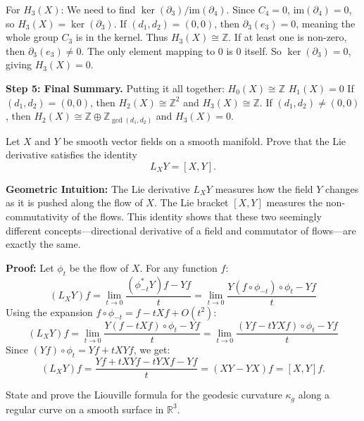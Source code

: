 \begin{solution}
For $H_3(X)$: We need to find $\ker(\partial_3) / \mathrm{im}(\partial_4)$. Since $C_4=0$, $\mathrm{im}(\partial_4)=0$, so $H_3(X) = \ker(\partial_3)$.
If $(d_1, d_2) = (0,0)$, then $\partial_3(e_3) = 0$, meaning the whole group $C_3$ is in the kernel. Thus $H_3(X) \cong \mathbb{Z}$.
If at least one is non-zero, then $\partial_3(e_3) \neq 0$. The only element mapping to $0$ is $0$ itself. So $\ker(\partial_3) = 0$, giving $H_3(X) = 0$.

\textbf{Step 5: Final Summary.}
Putting it all together:
$H_0(X) \cong \mathbb{Z}$
$H_1(X) = 0$
If $(d_1, d_2) = (0,0)$, then $H_2(X) \cong \mathbb{Z}^2$ and $H_3(X) \cong \mathbb{Z}$.
If $(d_1, d_2) \neq (0,0)$, then $H_2(X) \cong \mathbb{Z} \oplus \mathbb{Z}_{\gcd(d_1, d_2)}$ and $H_3(X) = 0$.
\end{solution}

\begin{exercise}
\label{geometry:2017:3}
Let $X$ and $Y$ be smooth vector fields on a smooth manifold. Prove that the Lie derivative satisfies the identity
\[ L_{X}Y = [X, Y]. \]
\end{exercise}

\begin{solution}
\textbf{Geometric Intuition:} The Lie derivative $L_X Y$ measures how the field $Y$ changes as it is pushed along the flow of $X$. The Lie bracket $[X, Y]$ measures the non-commutativity of the flows. This identity shows that these two seemingly different concepts—directional derivative of a field and commutator of flows—are exactly the same.

\textbf{Proof:} Let $\phi_t$ be the flow of $X$. For any function $f$:
\[ (L_X Y) f = \lim_{t \to 0} \frac{(\phi_{-t}^* Y) f - Y f}{t} = \lim_{t \to 0} \frac{Y(f \circ \phi_{-t}) \circ \phi_t - Y f}{t} \]
Using the expansion $f \circ \phi_{-t} = f - t X f + O(t^2)$:
\[ (L_X Y) f = \lim_{t \to 0} \frac{Y(f - t X f) \circ \phi_t - Y f}{t} = \lim_{t \to 0} \frac{(Y f - t Y X f) \circ \phi_t - Y f}{t} \]
Since $(Yf) \circ \phi_t = Yf + t XYf$, we get:
\[ (L_X Y) f = \frac{Yf + t XYf - t YXf - Yf}{t} = (XY - YX) f = [X, Y] f. \]
\end{solution}

\begin{exercise}
\label{geometry:2017:4}
State and prove the Liouville formula for the geodesic curvature $\kappa_{g}$ along a regular curve on a smooth surface in $\mathbb{R}^{3}$.
\end{exercise}

